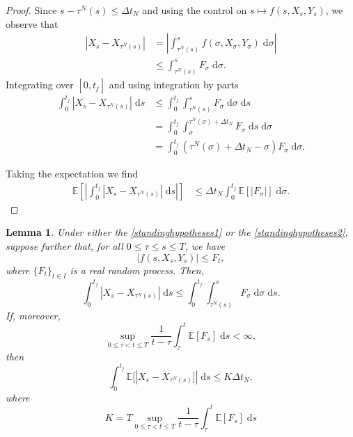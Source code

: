 \documentclass[reqno,12pt]{amsart}
\theoremstyle{plain}%
\newtheorem{lem}{Lemma}[section]
\theoremstyle{definition}
\begin{document}
\begin{proof}
    Since $s - \tau^N(s) \leq \Delta t_N$ and using the control on $s \mapsto f(s, X_s, Y_s)$, we observe that
    \begin{align*}
      \left|X_s - X_{\tau^N(s)}\right| & = \left|\int_{\tau^N(s)}^s f(\sigma, X_\sigma, Y_\sigma)\;\mathrm{d}\sigma\right| \\
      & \leq \int_{\tau^N(s)}^s F_\sigma \;\mathrm{d}\sigma.
    \end{align*}
    Integrating over $[0, t_j]$ and using integration by parts
    \begin{align*}
        \int_0^{t_j}\left|X_s - X_{\tau^N(s)}\right| \;\mathrm{d}s & \leq \int_0^{t_j}\int_{\tau^N(s)}^s F_\sigma \;\mathrm{d}\sigma \;\mathrm{d}s \\
        & = \int_0^{t_j}\int_\sigma^{\tau^N(\sigma) + \Delta t_N} F_\sigma \;\mathrm{d}s \;\mathrm{d}\sigma \\
        & =  \int_0^{t_j} (\tau^N(\sigma) + \Delta t_N - \sigma) F_\sigma \;\mathrm{d}\sigma.
    \end{align*}

    Taking the expectation we find
    \begin{align*}
        \mathbb{E}\left[\left|\int_0^{t_j}\left|X_s - X_{\tau^N(s)}\right| \;\mathrm{d}s\right|\right] & \leq \Delta t_N \int_0^{t_j} \mathbb{E}[|F_\sigma|]\;\mathrm{d}\sigma.
    \end{align*}
\end{proof}

\begin{lem}
    \label{estimatesecondterminglobalerror}
    Under either the \cref{standinghypotheses1} or the \cref{standinghypotheses2}, suppose further that, for all $0 \leq \tau \leq s \leq T$, we have
    \begin{equation}
        \label{Ftcondition}
      |f(s, X_s, Y_s)| \leq F_t,
    \end{equation}
    where $\{F_t\}_{t\in I}$ is a real random process. Then,
    \begin{equation}
        \label{estimatesecondterminglobalerrorintegral}
        \int_0^{t_j} |X_s - X_{\tau^N(s)}| \;\mathrm{d}s \leq \int_0^{t_j} \int_{\tau^N(s)}^s F_\sigma \;\mathrm{d}\sigma \;\mathrm{d}s.
    \end{equation}
    If, moreover,
    \begin{equation}
        \label{averageFtestimate}
        \sup_{0 \leq \tau < t \leq T}\frac{1}{t - \tau}\int_\tau^t \mathbb{E}[F_s]\;\mathrm{d}s < \infty,
    \end{equation}
    then
    \begin{equation}
        \label{expectedestimatesecondterminglobalerrorintegral}
        \int_0^{t_j} \mathbb{E}[|X_s - X_{\tau^N(s)}]| \;\mathrm{d}s \leq K \Delta t_N,
    \end{equation}
    where
    \begin{equation}
      \label{Kconstantinestimatesecondterminglobalerror}
        K = T\sup_{0 \leq \tau < t \leq T}\frac{1}{t - \tau}\int_\tau^t \mathbb{E}[F_s]\;\mathrm{d}s
    \end{equation}
\end{lem}
\end{document}
